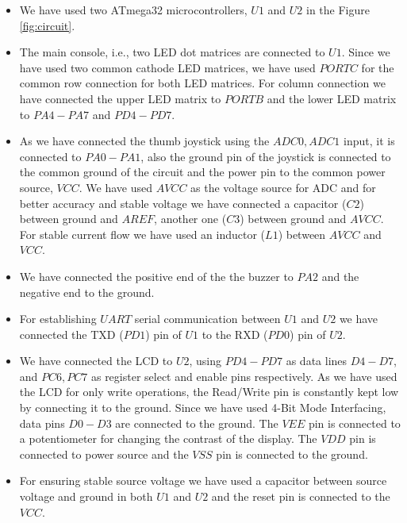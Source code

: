 \documentclass[12pt]{article}
\begin{document}
    \begin{itemize}[leftmargin=*]
    \setlength\itemsep{-0.1em}
        \item We have used two ATmega32 microcontrollers, $U1$ and $U2$ in the Figure \ref{fig:circuit}.%
        
        \item The main console, i.e., two LED dot matrices are connected to $U1$. Since we have used two common cathode LED matrices, we have used $PORTC$ for the common row connection for both LED matrices. For column connection we have connected the upper LED matrix to $PORTB$ and the lower LED matrix to $PA4-PA7$ and $PD4-PD7$.%
    
        \item As we have connected the thumb joystick using the $ADC0,ADC1$ input, it is connected to $PA0-PA1$, also the ground pin of the joystick is connected to the common ground of the circuit and the power pin to the common power source, $VCC$. We have used $AVCC$ as the voltage source for ADC and for better accuracy and stable voltage we have connected a capacitor ($C2$) between ground and $AREF$, another one ($C3$) between ground and $AVCC$. For stable current flow we have used an inductor ($L1$) between $AVCC$ and $VCC$.%
    
        \item We have connected the positive end of the the buzzer to $PA2$ and the negative end to the ground.%
        
        \item For establishing $UART$ serial communication between $U1$ and $U2$ we have connected the TXD ($PD1$) pin of $U1$ to the RXD ($PD0$) pin of $U2$.%
    
        \item We have connected the LCD to $U2$, using $PD4-PD7$ as data lines $D4-D7$, and $PC6,PC7$ as register select and enable pins respectively. As we have used the LCD for only write operations, the Read/Write pin is constantly kept low by connecting it to the ground. Since we have used 4-Bit Mode Interfacing, data pins $D0-D3$ are connected to the ground. The $VEE$ pin is connected to a potentiometer for changing the contrast of the display. The $VDD$ pin is connected to power source and the $VSS$ pin is connected to the ground.%
    
        \item For ensuring stable source voltage we have used a capacitor between source voltage and ground in both $U1$ and $U2$ and the reset pin is connected to the $VCC$.
    \end{itemize}
   
\end{document}
